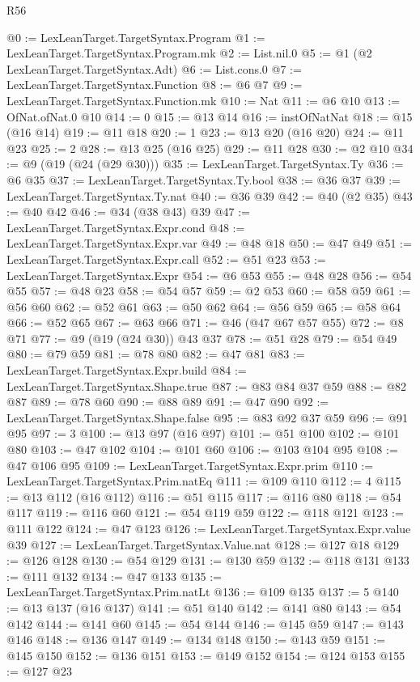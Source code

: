 \begin{lexlean}{R56}
\begin{coremodule}
@0 := LexLeanTarget.TargetSyntax.Program
@1 := LexLeanTarget.TargetSyntax.Program.mk
@2 := List.nil.{0}
@5 := @1 (@2 LexLeanTarget.TargetSyntax.Adt)
@6 := List.cons.{0}
@7 := LexLeanTarget.TargetSyntax.Function
@8 := @6 @7
@9 := LexLeanTarget.TargetSyntax.Function.mk
@10 := Nat
@11 := @6 @10
@13 := OfNat.ofNat.{0} @10
@14 := 0
@15 := @13 @14
@16 := instOfNatNat
@18 := @15 (@16 @14)
@19 := @11 @18
@20 := 1
@23 := @13 @20 (@16 @20)
@24 := @11 @23
@25 := 2
@28 := @13 @25 (@16 @25)
@29 := @11 @28
@30 := @2 @10
@34 := @9 (@19 (@24 (@29 @30)))
@35 := LexLeanTarget.TargetSyntax.Ty
@36 := @6 @35
@37 := LexLeanTarget.TargetSyntax.Ty.bool
@38 := @36 @37
@39 := LexLeanTarget.TargetSyntax.Ty.nat
@40 := @36 @39
@42 := @40 (@2 @35)
@43 := @40 @42
@46 := @34 (@38 @43) @39
@47 := LexLeanTarget.TargetSyntax.Expr.cond
@48 := LexLeanTarget.TargetSyntax.Expr.var
@49 := @48 @18
@50 := @47 @49
@51 := LexLeanTarget.TargetSyntax.Expr.call
@52 := @51 @23
@53 := LexLeanTarget.TargetSyntax.Expr
@54 := @6 @53
@55 := @48 @28
@56 := @54 @55
@57 := @48 @23
@58 := @54 @57
@59 := @2 @53
@60 := @58 @59
@61 := @56 @60
@62 := @52 @61
@63 := @50 @62
@64 := @56 @59
@65 := @58 @64
@66 := @52 @65
@67 := @63 @66
@71 := @46 (@47 @67 @57 @55)
@72 := @8 @71
@77 := @9 (@19 (@24 @30)) @43 @37
@78 := @51 @28
@79 := @54 @49
@80 := @79 @59
@81 := @78 @80
@82 := @47 @81
@83 := LexLeanTarget.TargetSyntax.Expr.build
@84 := LexLeanTarget.TargetSyntax.Shape.true
@87 := @83 @84 @37 @59
@88 := @82 @87
@89 := @78 @60
@90 := @88 @89
@91 := @47 @90
@92 := LexLeanTarget.TargetSyntax.Shape.false
@95 := @83 @92 @37 @59
@96 := @91 @95
@97 := 3
@100 := @13 @97 (@16 @97)
@101 := @51 @100
@102 := @101 @80
@103 := @47 @102
@104 := @101 @60
@106 := @103 @104 @95
@108 := @47 @106 @95
@109 := LexLeanTarget.TargetSyntax.Expr.prim
@110 := LexLeanTarget.TargetSyntax.Prim.natEq
@111 := @109 @110
@112 := 4
@115 := @13 @112 (@16 @112)
@116 := @51 @115
@117 := @116 @80
@118 := @54 @117
@119 := @116 @60
@121 := @54 @119 @59
@122 := @118 @121
@123 := @111 @122
@124 := @47 @123
@126 := LexLeanTarget.TargetSyntax.Expr.value @39
@127 := LexLeanTarget.TargetSyntax.Value.nat
@128 := @127 @18
@129 := @126 @128
@130 := @54 @129
@131 := @130 @59
@132 := @118 @131
@133 := @111 @132
@134 := @47 @133
@135 := LexLeanTarget.TargetSyntax.Prim.natLt
@136 := @109 @135
@137 := 5
@140 := @13 @137 (@16 @137)
@141 := @51 @140
@142 := @141 @80
@143 := @54 @142
@144 := @141 @60
@145 := @54 @144
@146 := @145 @59
@147 := @143 @146
@148 := @136 @147
@149 := @134 @148
@150 := @143 @59
@151 := @145 @150
@152 := @136 @151
@153 := @149 @152
@154 := @124 @153
@155 := @127 @23

\end{coremodule}
\end{lexlean}
